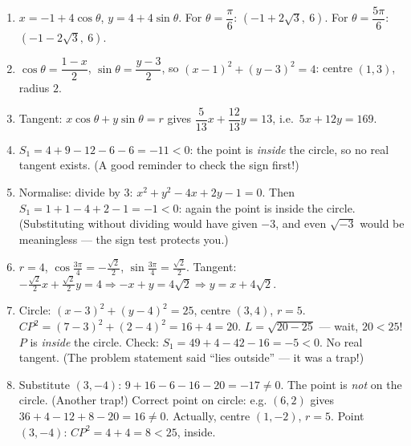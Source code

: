 \documentclass[11pt]{article}
\begin{document}
\begin{corrige}[Exercise 1]
\begin{enumerate}
\item $x = -1 + 4\cos\theta$, $y = 4 + 4\sin\theta$. For $\theta = \dfrac{\pi}{6}$: $\left(-1 + 2\sqrt3,\ 6\right)$. For $\theta = \dfrac{5\pi}{6}$: $\left(-1 - 2\sqrt3,\ 6\right)$.
\item $\cos\theta = \dfrac{1-x}{2}$, $\sin\theta = \dfrac{y-3}{2}$, so $(x-1)^2 + (y-3)^2 = 4$: centre $(1, 3)$, radius $2$.
\item Tangent: $x\cos\theta + y\sin\theta = r$ gives $\dfrac{5}{13}x + \dfrac{12}{13}y = 13$, i.e.\ $5x + 12y = 169$.
\item $S_1 = 4 + 9 - 12 - 6 - 6 = -11 < 0$: the point is \emph{inside} the circle, so no real tangent exists. (A good reminder to check the sign first!)
\item Normalise: divide by $3$: $x^2 + y^2 - 4x + 2y - 1 = 0$. Then $S_1 = 1 + 1 - 4 + 2 - 1 = -1 < 0$: again the point is inside the circle. (Substituting without dividing would have given $-3$, and even $\sqrt{-3}$ would be meaningless — the sign test protects you.)
\item $r=4$, $\cos\frac{3\pi}{4}=-\frac{\sqrt2}{2}$, $\sin\frac{3\pi}{4}=\frac{\sqrt2}{2}$. Tangent: $-\frac{\sqrt2}{2}x + \frac{\sqrt2}{2}y = 4 \Rightarrow -x + y = 4\sqrt2 \Rightarrow y = x + 4\sqrt2$.
\item Circle: $(x-3)^2 + (y-4)^2 = 25$, centre $(3,4)$, $r=5$. $CP^2 = (7-3)^2 + (2-4)^2 = 16+4=20$. $L = \sqrt{20-25}$ — wait, $20 < 25$! $P$ is \emph{inside} the circle. Check: $S_1 = 49+4-42-16 = -5 < 0$. No real tangent. (The problem statement said ``lies outside'' — it was a trap!)
\item Substitute $(3,-4)$: $9+16-6-16-20 = -17 \ne 0$. The point is \emph{not} on the circle. (Another trap!) Correct point on circle: e.g. $(6,2)$ gives $36+4-12+8-20=16\ne0$. Actually, centre $(1,-2)$, $r=5$. Point $(3,-4)$: $CP^2 = 4+4=8 < 25$, inside.
\end{enumerate}
\end{corrige}
\end{document}
